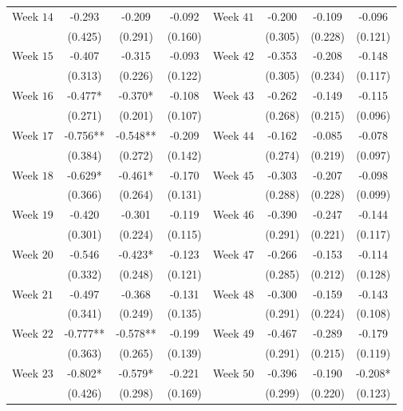 \begin{table}[htbp]
\begin{threeparttable}
\begin{tabular}{lccc lccc}
Week $14$ & -0.293 & -0.209 & -0.092 & Week $41$ & -0.200 & -0.109 & -0.096 \\
          & (0.425) & (0.291) & (0.160) &           & (0.305) & (0.228) & (0.121) \\

Week $15$ & -0.407 & -0.315 & -0.093 & Week $42$ & -0.353 & -0.208 & -0.148 \\
          & (0.313) & (0.226) & (0.122) &           & (0.305) & (0.234) & (0.117) \\

Week $16$ & -0.477* & -0.370* & -0.108 & Week $43$ & -0.262 & -0.149 & -0.115 \\
          & (0.271) & (0.201) & (0.107) &           & (0.268) & (0.215) & (0.096) \\

Week $17$ & -0.756** & -0.548** & -0.209 & Week $44$ & -0.162 & -0.085 & -0.078 \\
          & (0.384)  & (0.272)  & (0.142) &           & (0.274) & (0.219) & (0.097) \\

Week $18$ & -0.629* & -0.461* & -0.170 & Week $45$ & -0.303 & -0.207 & -0.098 \\
          & (0.366) & (0.264) & (0.131) &           & (0.288) & (0.228) & (0.099) \\

Week $19$ & -0.420 & -0.301 & -0.119 & Week $46$ & -0.390 & -0.247 & -0.144 \\
          & (0.301) & (0.224) & (0.115) &           & (0.291) & (0.221) & (0.117) \\

Week $20$ & -0.546 & -0.423* & -0.123 & Week $47$ & -0.266 & -0.153 & -0.114 \\
          & (0.332) & (0.248) & (0.121) &           & (0.285) & (0.212) & (0.128) \\

Week $21$ & -0.497 & -0.368 & -0.131 & Week $48$ & -0.300 & -0.159 & -0.143 \\
          & (0.341) & (0.249) & (0.135) &           & (0.291) & (0.224) & (0.108) \\

Week $22$ & -0.777** & -0.578** & -0.199 & Week $49$ & -0.467 & -0.289 & -0.179 \\
          & (0.363)  & (0.265)  & (0.139) &           & (0.291) & (0.215) & (0.119) \\

Week $23$ & -0.802* & -0.579* & -0.221 & Week $50$ & -0.396 & -0.190 & -0.208* \\
          & (0.426) & (0.298) & (0.169) &           & (0.299) & (0.220) & (0.123) \\


\end{tabular}
\end{threeparttable}
\end{table}
